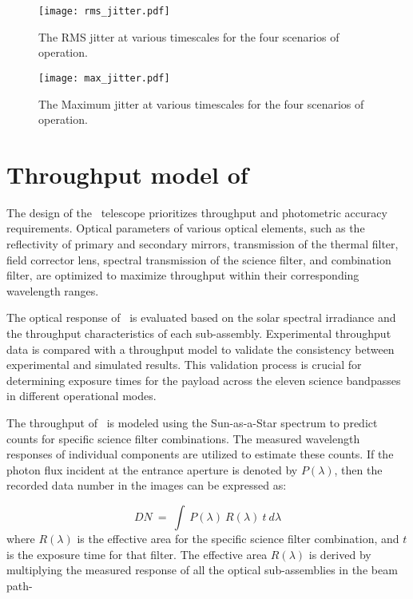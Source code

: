 \begin{figure}[ht!]
    \centering
    \texttt{[image: rms\_jitter.pdf]}
    \caption{The RMS jitter at various timescales for the four scenarios of operation.}
    \label{fig:rms_jitter}
\end{figure}

\begin{figure}[ht!]
    \centering
    \texttt{[image: max\_jitter.pdf]}
    \caption{The Maximum jitter at various timescales for the four scenarios of operation.}
    \label{fig:max_jitter}
\end{figure}

\section{Throughput model of {\suit}}\label{sec:suit_throughput}

The design of the \suit~telescope prioritizes throughput and photometric accuracy requirements. Optical parameters of various optical elements, such as the reflectivity of primary and secondary mirrors, transmission of the thermal filter, field corrector lens, spectral transmission of the science filter, and combination filter, are optimized to maximize throughput within their corresponding wavelength ranges.

The optical response of \suit~is evaluated based on the solar spectral irradiance and the throughput characteristics of each sub-assembly. Experimental throughput data is compared with a throughput model to validate the consistency between experimental and simulated results. This validation process is crucial for determining exposure times for the payload across the eleven science bandpasses in different operational modes.

The throughput of \suit~is modeled using the Sun-as-a-Star spectrum to predict counts for specific science filter combinations. The measured wavelength responses of individual components are utilized to estimate these counts. If the photon flux incident at the entrance aperture is denoted by $P(\lambda)$, then the recorded data number in the images can be expressed as:

 \begin{equation}\label{eq1}
     DN~=~\int~P(\lambda)~R(\lambda)~t~d\lambda
 \end{equation}
where $R(\lambda)$ is the effective area for the specific science filter combination, and $t$ is the exposure time for that filter. The effective area $R(\lambda)$ is derived by multiplying the measured response of all the optical sub-assemblies in the beam path-

